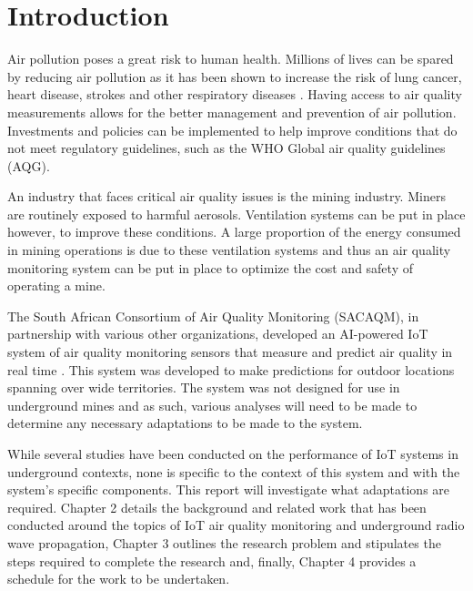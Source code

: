 \documentclass[a4paper,twoside,12pt]{report}
\begin{document}
\tableofcontents
\newpage
{}
{}
\listoffigures
\newpage
{}
{}
\listoftables
\newpage
{}

\chapter{Introduction}
Air pollution poses a great risk to human health. Millions of lives can be spared by reducing air pollution as it has been shown to increase the risk of lung cancer, heart disease, strokes and other respiratory diseases \citep{WHO_2022}. Having access to air quality measurements allows for the better management and prevention of air pollution. Investments and policies can be implemented to help improve conditions that do not meet regulatory guidelines, such as the WHO Global air quality guidelines (AQG).
\newline

An industry that faces critical air quality issues is the mining industry. Miners are routinely exposed to harmful aerosols. Ventilation systems can be put in place however, to improve these conditions. A large proportion of the energy consumed in mining operations is due to these ventilation systems and thus an air quality monitoring system can be put in place to optimize the cost and safety of operating a mine\citep{Hercus_2022}.
\newline

The South African Consortium of Air Quality Monitoring (SACAQM), in partnership with various other organizations, developed an AI-powered IoT system of air quality monitoring sensors that measure and predict air quality in real time \citep{SACAQM}. This system was developed to make predictions for outdoor locations spanning over wide territories. The system was not designed for use in underground mines and as such, various analyses will need to be made to determine any necessary adaptations to be made to the system.
\newline

While several studies have been conducted on the performance of IoT systems in underground contexts, none is specific to the context of this system and with the system's specific components. This report will investigate what adaptations are required. Chapter 2 details the background and related work that has been conducted around the topics of IoT air quality monitoring and underground radio wave propagation, Chapter 3 outlines the research problem and stipulates the steps required to complete the research and, finally, Chapter 4 provides a schedule for the work to be undertaken.
\end{document}
